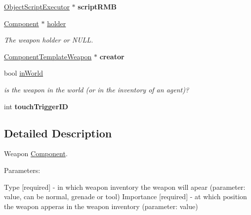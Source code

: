 \begin{DoxyCompactItemize}
\item 
\hypertarget{classComponentWeapon_a9a1614125eba4bbdfb819452d75b8979}{
\hyperlink{classObjectScriptExecutor}{\-Object\-Script\-Executor} $\ast$ {\bfseries script\-R\-M\-B}}
\label{de/df8/classComponentWeapon_a9a1614125eba4bbdfb819452d75b8979}

\item 
\hypertarget{classComponentWeapon_a30994bd6ddd153d5ac04c1cb93ae107e}{
\hyperlink{classComponent}{\-Component} $\ast$ \hyperlink{classComponentWeapon_a30994bd6ddd153d5ac04c1cb93ae107e}{holder}}
\label{de/df8/classComponentWeapon_a30994bd6ddd153d5ac04c1cb93ae107e}

\begin{DoxyCompactList}\small\item\em \-The weapon holder or \-N\-U\-L\-L. \end{DoxyCompactList}\item 
\hypertarget{classComponentWeapon_ad075c58c5ffd1f62ce78f59f97ac5a00}{
\hyperlink{classComponentTemplateWeapon}{\-Component\-Template\-Weapon} $\ast$ {\bfseries creator}}
\label{de/df8/classComponentWeapon_ad075c58c5ffd1f62ce78f59f97ac5a00}

\item 
\hypertarget{classComponentWeapon_a6149391a5282d85bdac2e33073a4d295}{
bool \hyperlink{classComponentWeapon_a6149391a5282d85bdac2e33073a4d295}{in\-World}}
\label{de/df8/classComponentWeapon_a6149391a5282d85bdac2e33073a4d295}

\begin{DoxyCompactList}\small\item\em is the weapon in the world (or in the inventory of an agent)? \end{DoxyCompactList}\item 
\hypertarget{classComponentWeapon_abff538843898a88b4313d4a073f69d83}{
int {\bfseries touch\-Trigger\-I\-D}}
\label{de/df8/classComponentWeapon_abff538843898a88b4313d4a073f69d83}

\end{DoxyCompactItemize}


\subsection{\-Detailed \-Description}
\-Weapon \hyperlink{classComponent}{\-Component}. 

\-Parameters\-:\par
 \-Type \mbox{[}required\mbox{]} -\/ in which weapon inventory the weapon will apear (parameter\-: value, can be normal, grenade or tool) \-Importance \mbox{[}required\mbox{]} -\/ at which position the weapon apperas in the weapon inventory (parameter\-: value) 

